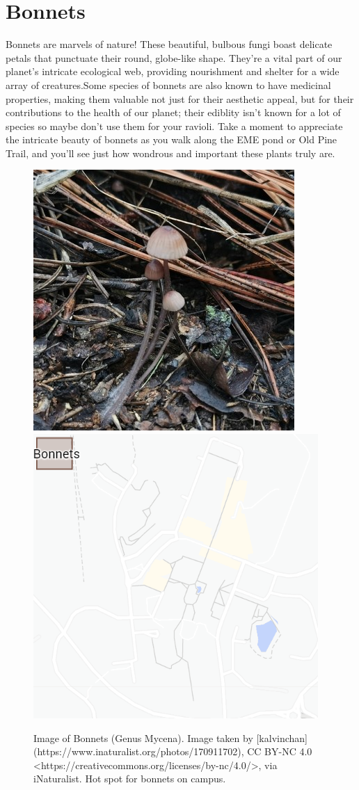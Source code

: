 \documentclass[
]{book}
\begin{document}
\hypertarget{bonnets}{%
\section{Bonnets}\label{bonnets}}

Bonnets are marvels of nature! These beautiful, bulbous fungi boast delicate petals that punctuate their round, globe-like shape. They're a vital part of our planet's intricate ecological web, providing nourishment and shelter for a wide array of creatures.Some species of bonnets are also known to have medicinal properties, making them valuable not just for their aesthetic appeal, but for their contributions to the health of our planet; their ediblity isn't known for a lot of species so maybe don't use them for your ravioli. Take a moment to appreciate the intricate beauty of bonnets as you walk along the EME pond or Old Pine Trail, and you'll see just how wondrous and important these plants truly are.

\begin{figure}

{\centering \includegraphics[width=0.49\linewidth,height=0.2\textheight]{plant_images/bonnets_11} \includegraphics[width=0.49\linewidth,height=0.2\textheight]{plant_images/bonnets_hotspot_11} 

}

\caption{Image of Bonnets (Genus Mycena). Image taken by [kalvinchan](https://www.inaturalist.org/photos/170911702), CC BY-NC 4.0 <https://creativecommons.org/licenses/by-nc/4.0/>, via iNaturalist. Hot spot for bonnets on campus.}\label{fig:unnamed-chunk-7}
\end{figure}
\end{document}
